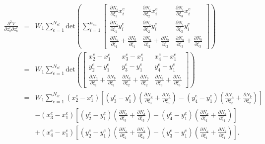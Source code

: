 \begin{eqnarray}
\frac{\partial^2 V}{\partial z_a^e \partial z_b^e} &=& W_1\sum_{e=1}^{N_{el}} \text{det}\left(\sum_{i=1}^{n_{en}} \begin{bmatrix}
\frac{\partial N_i}{\partial \xi_1}x_i^e  & \frac{\partial N_i}{\partial \xi_2}x_i^e  & \frac{\partial N_i}{\partial \xi_3}x_i^e \\
%
\frac{\partial N_i}{\partial \xi_1}y_i^e & \frac{\partial N_i}{\partial \xi_2}y_i^e & \frac{\partial N_i}{\partial \xi_3}y_i^e \\
%
\frac{\partial N_a}{\partial \xi_1}+\frac{\partial N_b}{\partial \xi_1}  & \frac{\partial N_a}{\partial \xi_2}+\frac{\partial N_b}{\partial \xi_2}  & \frac{\partial N_a}{\partial \xi_3}+\frac{\partial N_b}{\partial \xi_3} 
\end{bmatrix}\right) \nonumber\\
&=& W_1\sum_{e=1}^{N_{el}} \text{det}\left( \begin{bmatrix}
x_2^e - x_1^e & x_3^e - x_1^e & x_4^e - x_1^e \\
%
y_2^e - y_1^e & y_3^e - y_1^e & y_4^e - y_1^e \\
%
\frac{\partial N_a}{\partial \xi_1}+\frac{\partial N_b}{\partial \xi_1}  & \frac{\partial N_a}{\partial \xi_2}+\frac{\partial N_b}{\partial \xi_2}  & \frac{\partial N_a}{\partial \xi_3}+\frac{\partial N_b}{\partial \xi_3} 
\end{bmatrix}\right) \nonumber\\
%
&=&W_1\sum_{e=1}^{N_{el}}(x_2^e - x_1^e)\left[(y_3^e - y_1^e)\left(\frac{\partial N_a}{\partial \xi_3}+\frac{\partial N_b}{\partial \xi_3}\right)-(y_4^e - y_1^e)\left(\frac{\partial N_a}{\partial \xi_2}+\frac{\partial N_b}{\partial \xi_2}\right)\right] \nonumber\\
%
&&-(x_3^e - x_1^e)\left[(y_2^e - y_1^e)\left(\frac{\partial N_a}{\partial \xi_3}+\frac{\partial N_b}{\partial \xi_3}\right)-(y_4^e - y_1^e)\left(\frac{\partial N_a}{\partial \xi_1}+\frac{\partial N_b}{\partial \xi_1}\right)\right] \nonumber\\
%
&&+(x_4^e - x_1^e)\left[(y_2^e - y_1^e)\left(\frac{\partial N_a}{\partial \xi_2}+\frac{\partial N_b}{\partial \xi_2}\right)-(y_3^e - y_1^e)\left(\frac{\partial N_a}{\partial \xi_1}+\frac{\partial N_b}{\partial \xi_1}\right)\right].
\end{eqnarray}


